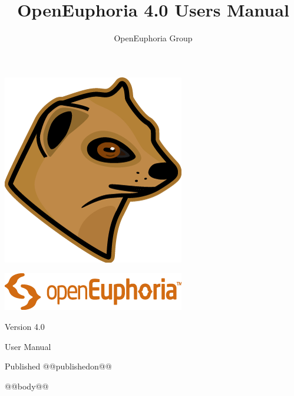 \documentclass[openany]{book}
\begin{document}
\frontmatter
\title{OpenEuphoria 4.0 Users Manual}
\author{OpenEuphoria Group}
{\centering%
  \includegraphics{./images/300px-mongoose-head-colour-v2-r0.png}%
  \par\vspace*{40pt}%
  \includegraphics{./images/300px-logo-logotype-orange-v2-r0.png}%
  \par{\fontsize{28}{36}\selectfont Version 4.0}%
  \vspace*{90pt}%
  \par{\fontsize{48}{58}\selectfont User Manual}%
  \vspace*{12pt}%
  \par{Published @@publishedon@@}%
  \newpage%
}

\setcounter{tocdepth}{1}
\tableofcontents

\pagestyle{fancy}
\mainmatter

@@body@@
\end{document}
